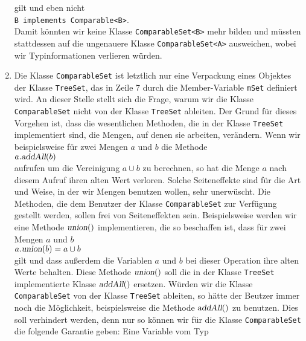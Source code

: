 \begin{enumerate}
      gilt und eben nicht
      \\[0.2cm]
      \hspace*{1.3cm}
      \texttt{B implements Comparable<B>}.
      \\[0.2cm]
      Damit k\"onnten wir keine Klasse \texttt{ComparableSet<B>} mehr bilden und
      m\"ussten stattdessen auf die ungenauere Klasse \texttt{ComparableSet<A>} ausweichen,
      wobei  wir Typinformationen verlieren w\"urden.
\item Die Klasse \texttt{ComparableSet} ist letztlich nur eine Verpackung eines 
      Objektes der Klasse \texttt{TreeSet}, das in Zeile 7 durch die Member-Variable
      \texttt{mSet}  definiert wird.  An dieser Stelle stellt sich die Frage,
      warum wir die Klasse \texttt{ComparableSet} nicht von der Klasse \texttt{TreeSet}
      ableiten.  Der Grund f\"ur dieses Vorgehen ist, dass die wesentlichen Methoden, die in der
      Klasse \texttt{TreeSet} implementiert sind, die Mengen, auf denen sie arbeiten,
      ver\"andern.  Wenn wir beispielsweise f\"ur zwei Mengen $a$ und $b$ die Methode
      \\[0.2cm]
      \hspace*{1.3cm}
      $a.\textsl{addAll}(b)$
      \\[0.2cm]
      aufrufen um die Vereinigung $a \cup b$ zu berechnen, so hat die Menge $a$ nach
      diesem Aufruf ihren alten Wert verloren.  Solche Seiteneffekte sind f\"ur die Art und
      Weise, in der wir Mengen benutzen wollen, sehr unerw\"uscht.  Die Methoden, die dem
      Benutzer der Klasse \texttt{ComparableSet} zur Verf\"ugung gestellt werden, sollen
      frei von Seiteneffekten sein.  Beispielsweise werden wir eine Methode $\textsl{union}()$
      implementieren, die so beschaffen ist, dass f\"ur zwei Mengen $a$ und $b$
      \\[0.2cm]
      \hspace*{1.3cm}
      $a.\textsl{union}(b) = a \cup b$
      \\[0.2cm]
      gilt und dass au{\ss}erdem die Variablen $a$ und $b$ bei dieser Operation ihre alten Werte behalten.
      Diese Methode $\textsl{union}()$ soll die in der Klasse \texttt{TreeSet} implementierte Klasse
      $\textsl{addAll}()$ ersetzen.  W\"urden wir die Klasse \texttt{ComparableSet} von der Klasse
      \texttt{TreeSet} ableiten, so h\"atte der Beutzer immer noch die M\"oglichkeit, beispielsweise die
      Methode $\textsl{addAll}()$ zu benutzen.  Dies soll verhindert werden, denn nur so k\"onnen wir f\"ur
      die Klasse \texttt{ComparableSet} die folgende Garantie geben: Eine Variable vom Typ

\end{enumerate}
